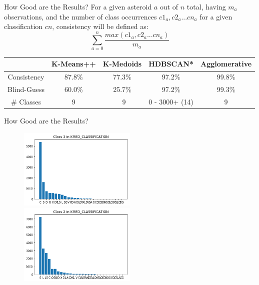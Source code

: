\documentclass[10pt,xcolor={table,dvipsnames},t]{beamer}
\begin{document}
\begin{frame}{How Good are the Results?}
For a given asteroid $a$ out of $n$ total, having $m_a$ observations, and the number of class occurrences $c1_a, c2_a ... cn_a$ for a given classification $cn$, consistency will be defined as:
$$
\sum_{a=0}^n \dfrac{max(c1_a, c2_a ... cn_a)}{m_a}
$$
\begin{tabular}{c | c | c | c | c}
     & K-Means++ & K-Medoids & HDBSCAN* & Agglomerative\\
     \hline
     Consistency & 87.8\% & 77.3\% & 97.2\% & 99.8\%\\
     Blind-Guess & 60.0\% & 25.7\% & 97.2\% & 99.3\%\\
     \# Classes  & 9      & ~9     & 0 - 3000+ (14) &  9
\end{tabular}
\end{frame}

\begin{frame}{How Good are the Results?}
\begin{figure}
\begin{center}
    \includegraphics[width=0.5\textwidth]{images/bar-sample.png}
    \includegraphics[width=0.5\textwidth]{images/bar-sample-2.png}
\end{center}
\end{figure}
\end{frame}
\end{document}
